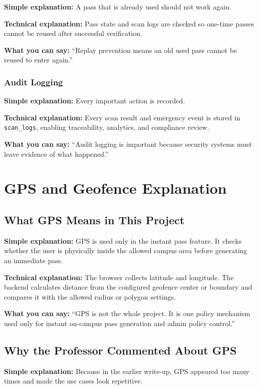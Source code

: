 \documentclass[12pt,letterpaper]{article}
\newcommand{\simple}[1]{\textbf{Simple explanation:} #1}
\newcommand{\technical}[1]{\textbf{Technical explanation:} #1}
\newcommand{\say}[1]{\textbf{What you can say:} ``#1''}
\begin{document}
\simple{A pass that is already used should not work again.}

\technical{Pass state and scan logs are checked so one-time passes cannot be reused after successful verification.}

\say{Replay prevention means an old used pass cannot be reused to enter again.}

\subsubsection{Audit Logging}

\simple{Every important action is recorded.}

\technical{Every scan result and emergency event is stored in \texttt{scan\_logs}, enabling traceability, analytics, and compliance review.}

\say{Audit logging is important because security systems must leave evidence of what happened.}

\section{GPS and Geofence Explanation}

\subsection{What GPS Means in This Project}

\simple{GPS is used only in the instant pass feature. It checks whether the user is physically inside the allowed campus area before generating an immediate pass.}

\technical{The browser collects latitude and longitude. The backend calculates distance from the configured geofence center or boundary and compares it with the allowed radius or polygon settings.}

\say{GPS is not the whole project. It is one policy mechanism used only for instant on-campus pass generation and admin policy control.}

\subsection{Why the Professor Commented About GPS}

\simple{Because in the earlier write-up, GPS appeared too many times and made the use cases look repetitive.}
\end{document}
